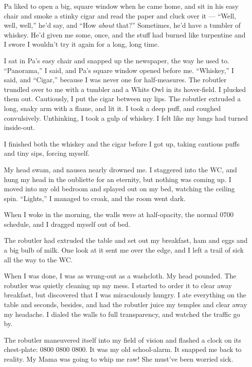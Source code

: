 Pa liked to open a big, square window when he came home, and sit in
his easy chair and smoke a stinky cigar and read the paper and
cluck over it --- ``Well, well, well,'' he'd say, and
``How \emph{about} that?'' Sometimes, he'd have a tumbler of
whiskey. He'd given me some, once, and the stuff had burned like
turpentine and I swore I wouldn't try it again for a long, long
time.

I sat in Pa's easy chair and snapped up the newspaper, the way he
used to. ``Panorama,'' I said, and Pa's square window opened before
me. ``Whiskey,'' I said, and ``Cigar,'' because I was never one for
half-measures. The robutler trundled over to me with a tumbler and
a White Owl in its hover-field. I plucked them out. Cautiously, I
put the cigar between my lips. The robutler extruded a long, snaky
arm with a flame, and lit it. I took a deep puff, and coughed
convulsively. Unthinking, I took a gulp of whiskey. I felt like my
lungs had turned inside-out.

I finished both the whiskey and the cigar before I got up, taking
cautious puffs and tiny sips, forcing myself.

My head swam, and nausea nearly drowned me. I staggered into the
WC, and hung my head in the oubliette for an eternity, but nothing
was coming up. I moved into my old bedroom and splayed out on my
bed, watching the ceiling spin. ``Lights,'' I managed to croak, and
the room went dark.

\tb

When I woke in the morning, the walls were at half-opacity, the
normal 0700 schedule, and I dragged myself out of bed.

The robutler had extruded the table and set out my breakfast, ham
and eggs and a big bulb of milk. One look at it sent me over the
edge, and I left a trail of sick all the way to the WC.

When I was done, I was as wrung-out as a washcloth. My head
pounded. The robutler was quietly cleaning up my mess. I started to
order it to clear away breakfast, but discovered that I was
miraculously hungry. I ate everything on the table and seconds,
besides, and had the robutler juice my temples and clear away my
headache. I dialed the walls to full transparency, and watched the
traffic go by.

The robutler maneuvered itself into my field of vision and flashed
a clock on its chest-plate: 0800 0800 0800. It was my old
school-alarm. It snapped me back to reality. My Mama was going to
whip me raw! She must've been worried sick.

